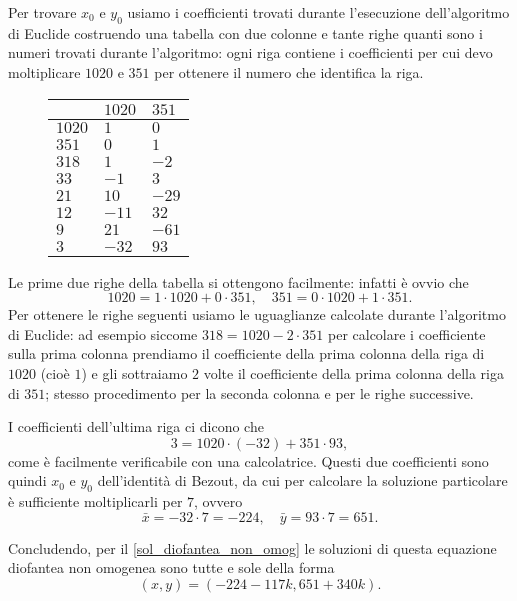 \begin{example}
    Per trovare $x_0$ e $y_0$ usiamo i coefficienti trovati durante l'esecuzione dell'algoritmo di Euclide costruendo una tabella con due colonne e tante righe quanti sono i numeri trovati durante l'algoritmo: ogni riga contiene i coefficienti per cui devo moltiplicare $1020$ e $351$ per ottenere il numero che identifica la riga.
    \begin{figure}[H]
        \centering
        \begin{tabular}{l|ll}
                   & $1020$ & $351$ \\ \hline
            $1020$ & $1$    & $0$   \\
            $351$  & $0$    & $1$   \\
            $318$  & $1$    & $-2$  \\
            $33$   & $-1$   & $3$   \\
            $21$   & $10$   & $-29$ \\
            $12$   & $-11$  & $32$  \\
            $9$    & $21$   & $-61$ \\
            $3$    & $-32$  & $93$ 
        \end{tabular}
    \end{figure}

    Le prime due righe della tabella si ottengono facilmente: infatti è ovvio che \[
        1020 = \boxed{1} \cdot 1020 + \boxed{0} \cdot 351, \quad 
        351  = \boxed{0} \cdot 1020 + \boxed{1} \cdot 351.
    \] Per ottenere le righe seguenti usiamo le uguaglianze calcolate durante l'algoritmo di Euclide: ad esempio siccome $318 = 1020 - 2 \cdot 351$ per calcolare i coefficiente sulla prima colonna prendiamo il coefficiente della prima colonna della riga di $1020$ (cioè $1$) e gli sottraiamo $2$ volte il coefficiente della prima colonna della riga di $351$; stesso procedimento per la seconda colonna e per le righe successive.

    I coefficienti dell'ultima riga ci dicono che \[
        3 = 1020 \cdot (-32) + 351 \cdot 93,     
    \] come è facilmente verificabile con una calcolatrice. Questi due coefficienti sono quindi $x_0$ e $y_0$ dell'identità di Bezout, da cui per calcolare la soluzione particolare è sufficiente moltiplicarli per $7$, ovvero \[
        \bar x = -32 \cdot 7 = -224, \quad \bar y = 93 \cdot 7 = 651.    
    \]

    Concludendo, per il \autoref{sol_diofantea_non_omog} le soluzioni di questa equazione diofantea non omogenea sono tutte e sole della forma \[
        (x, y) = (-224 - 117k, 651 + 340k).    
    \]
\end{example}